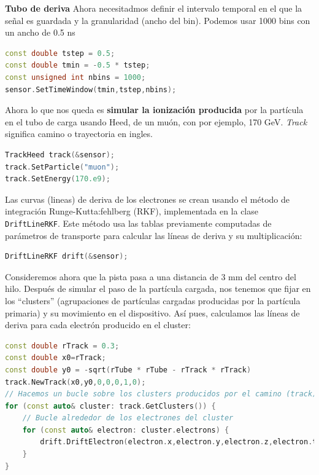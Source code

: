 \begin{Ejemplo}{\textbf{Tubo de deriva}}
Ahora necesitadmos definir el intervalo temporal en el que la señal es guardada y la granularidad (ancho del bin). Podemos usar 1000 bins con un ancho de 0.5 ns \\

\begin{lstlisting}[language=C++,style=c++]
const double tstep = 0.5;
const double tmin = -0.5 * tstep;
const unsigned int nbins = 1000;
sensor.SetTimeWindow(tmin,tstep,nbins);
\end{lstlisting} 
\vspace*{1em}

Ahora lo que nos queda es \textbf{simular la ionización producida} por la partícula en el tubo de carga usando Heed, de un muón, con por ejemplo, 170 GeV. \textit{Track} significa camino o trayectoria en ingles. \\

\begin{lstlisting}[language=C++,style=c++]
TrackHeed track(&sensor);
track.SetParticle("muon");
track.SetEnergy(170.e9);
\end{lstlisting} 
\vspace*{1em}

Las curvas (lineas) de deriva de los electrones se crean usando el método de integración Runge-Kutta:fehlberg (RKF), implementada en la clase \texttt{DriftLineRKF}. Este método usa las tablas previamente computadas de parámetros de transporte para calcular las líneas de deriva y su multiplicación: \\


\begin{lstlisting}[language=C++,style=c++]
DriftLineRKF drift(&sensor);
\end{lstlisting} 
\vspace*{1em}

Consideremos ahora que la pista pasa a una distancia de 3 mm del centro del hilo. Después de simular el paso de la partícula cargada, nos tenemos que fijar en los ``clusters'' (agrupaciones de partículas cargadas producidas por la partícula primaria) y su movimiento en el dispositivo. Así pues, calculamos las líneas de deriva para cada electrón producido en el cluster: 

\begin{lstlisting}[language=C++,style=c++]
const double rTrack = 0.3;
const double x0=rTrack;
const double y0 = -sqrt(rTube * rTube - rTrack * rTrack)
track.NewTrack(x0,y0,0,0,0,1,0);
// Hacemos un bucle sobre los clusters producidos por el camino (track)
for (const auto& cluster: track.GetClusters()) {
    // Bucle alrededor de los electrones del cluster
    for (const auto& electron: cluster.electrons) {
        drift.DriftElectron(electron.x,electron.y,electron.z,electron.t)
    }
}
\end{lstlisting} 
\vspace*{1em}


\end{Ejemplo}
